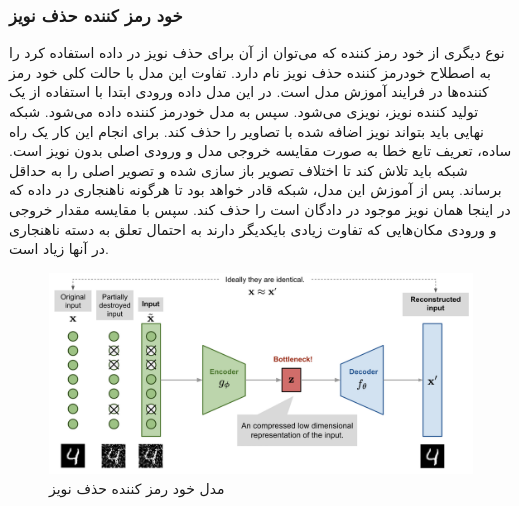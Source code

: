\documentclass[12pt,a4paper]{report}
\theoremstyle{definition}
\theoremstyle{definition}
\begin{document}
\subsubsection{خود رمز کننده حذف نویز}
نوع دیگری از خود رمز کننده که می‌توان از آن برای حذف نویز در داده استفاده کرد را به اصطلاح خودرمز کننده حذف نویز نام دارد. تفاوت این مدل با حالت کلی خود رمز کننده‌ها در فرایند آموزش مدل است. در این مدل داده ورودی ابتدا با استفاده از یک تولید کننده نویز، نویزی می‌شود. سپس به مدل خودرمز کننده داده می‌شود. شبکه نهایی باید بتواند نویز اضافه شده با تصاویر را حذف کند. برای انجام این کار یک راه ساده، تعریف تابع خطا به صورت مقایسه خروجی مدل و ورودی اصلی بدون نویز است. شبکه باید تلاش کند تا اختلاف تصویر باز سازی شده و تصویر اصلی را به حداقل برساند. پس از آموزش این مدل، شبکه قادر خواهد بود تا هرگونه ناهنجاری در داده که در اینجا همان نویز موجود در دادگان است را حذف کند. سپس با مقایسه مقدار خروجی و ورودی مکان‌هایی که تفاوت زیادی بایکدیگر دارند به احتمال تعلق به دسته ناهنجاری در آنها زیاد است.

\begin{figure}[!h]
	\begin{center}
		\includegraphics[width=\linewidth]{./images/figures/dae.png}
	\end{center}
	\caption{مدل خود رمز کننده حذف نویز}
	\label{fig:dae}
	\centering
\end{figure}
\end{document}
